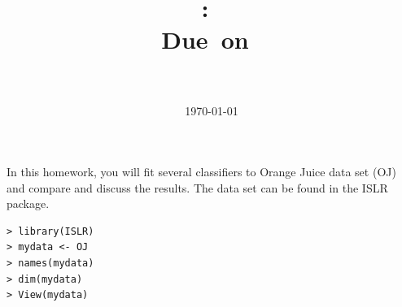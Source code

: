 \documentclass{article}
\title{
\vspace{2in}
\textmd{\textbf{\hmwkClass:\ \hmwkTitle}}\\
\normalsize\vspace{0.1in}\small{Due\ on\ \hmwkDueDate}\\
\vspace{0.1in}\large{\textit{\hmwkClassInstructor\ }}
\vspace{3in}
}
\author{\textbf{\hmwkAuthorName}}
\date{\today} %
\begin{document}
\maketitle



\newpage

In this homework, you will fit several classifiers to Orange Juice data set (OJ) and compare and discuss the results. The data set can be found in the ISLR package.

\begin{verbatim}
> library(ISLR)
> mydata <- OJ
> names(mydata)
> dim(mydata)
> View(mydata)
             
\end{verbatim}



\end{document}
